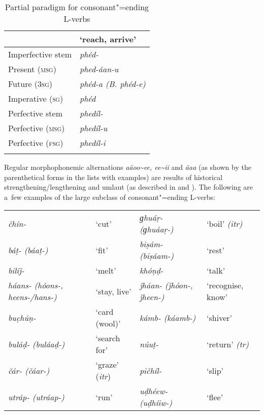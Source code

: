 \begin{table}[ht]
\caption{Partial paradigm for consonant"=ending L-verbs}
\begin{tabularx}{.75\textwidth}{ Q Q }
\lsptoprule
&
`reach, arrive'\\\hline
Imperfective stem &
\textit{phéd-} \\
Present (\textsc{msg}) &
\textit{phed-áan-u} \\
Future (\textsc{3sg}) &
\textit{phéd-a (B. phéd-e)} \\
Imperative (\textsc{sg}) &
\textit{phéd} \\
Perfective stem &
\textit{phedíl-} \\
Perfective (\textsc{msg}) &
\textit{phedíl-u} \\
Perfective (\textsc{fsg}) &
\textit{phedíl-i} \\\lspbottomrule
\end{tabularx}
\label{tab:8-4}
\end{table}


Regular morphophonemic alternations \textit{aãoo\~{}ee, ee\~{}ii} and \textit{ãaa} (as shown by the parenthetical forms in the lists with examples) are results of historical strengthening/lengthening and umlaut (as described in  and ). The following are a~few examples of the large subclass of consonant"=ending L-verbs: 


\begin{table}[H]
\begin{tabularx}{\textwidth}{ Q Q Q Q }
\textit{čhín-} &
`cut' &
\textit{ɡhuáṛ- (ɡhuáaṛ-)} &
`boil' \textit{(itr)}\\
\textit{báṭ- (báaṭ-)} &
`fit' &
\textit{biṣám- (biṣáam-)} &
`rest'\\
\textit{bilíǰ-} &
`melt' &
\textit{khóṇḍ-} &
`talk'\\
\textit{háans- (hóons-, heens-/hans-)} &
`stay, live'
&
\textit{ǰháan- (ǰhóon-, ǰheen-)} &
`recognise, know'\\
\textit{buc̣húṇ-} &
`card (wool)' &
\textit{kámb- (káamb-)} &
`shiver'\\
\textit{buláḍ- (buláaḍ-)} &
`search for' &
\textit{núuṭ-} &
`return' \textit{(tr)}\\
\textit{čár- (čáar-)} &
`graze' (\textit{itr}) &
\textit{pičhíl-} &
`slip'\\
\textit{utráp- (utráap-)} &
`run' &
\textit{uḍhéew- (uḍhíiw-)} &
`flee'\\
\end{tabularx}
\end{table}


